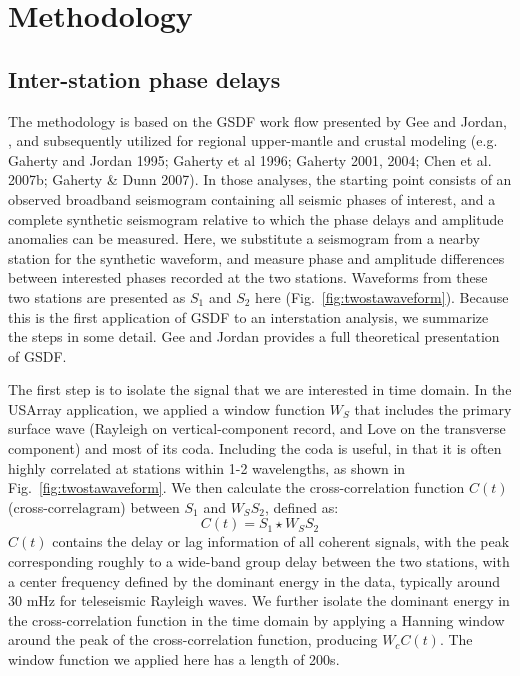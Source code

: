 \documentclass[referee]{gji}
\begin{document}
\section{Methodology}
\subsection{Inter-station phase delays}
\label{sec:gsdf}

The methodology is based on the GSDF work flow presented by Gee and Jordan, , and subsequently utilized for regional upper-mantle and crustal modeling (e.g. Gaherty and Jordan 1995; Gaherty et al 1996; Gaherty 2001, 2004; Chen et al. 2007b; Gaherty \& Dunn 2007).  In those analyses, the starting point consists of an observed broadband seismogram containing all seismic phases of interest, and a complete synthetic seismogram relative to which the phase delays and amplitude anomalies can be measured.  Here, we substitute a seismogram from a nearby station for the synthetic waveform, and measure phase and amplitude differences between interested phases recorded at the two stations. Waveforms from these two stations are presented as $S_1$ and $S_2$ here (Fig.~\ref{fig:twostawaveform}). Because this is the first application of GSDF to an interstation analysis, we summarize the steps in some detail.  Gee and Jordan  provides a full theoretical presentation of GSDF. 


The first step is to isolate the signal that we are interested in time domain. In the USArray application, we applied a window function $W_S$ that includes the primary surface wave (Rayleigh on vertical-component record, and Love on the transverse component) and most of its coda. Including the coda is useful, in that it is often highly correlated at stations within 1-2 wavelengths, as shown in Fig.~\ref{fig:twostawaveform}. We then calculate the cross-correlation function $C(t)$ (cross-correlagram) between $S_1$ and $W_SS_2$, defined as:
\[
C(t) = S_1 \star W_S S_2
\]
$C(t)$ contains the delay or lag information of all coherent signals, with the peak corresponding roughly to a wide-band group delay between the two stations, with a center frequency defined by the dominant energy in the data, typically around 30 mHz for teleseismic Rayleigh waves. We further isolate the dominant energy in the cross-correlation function in the time domain by applying a Hanning window around the peak of the cross-correlation function, producing $W_cC(t)$. The window function we applied here has a length of 200s.
\end{document}

